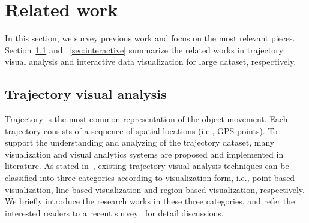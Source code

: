 \section{Related work}\label{sec:rel}
In this section, we survey previous work and focus on the most relevant pieces.
Section~\ref{sec:trajvisana} and ~\ref{sec:interactive} summarize the related works in trajectory visual analysis and interactive data visualization for large dataset, respectively.

\subsection{Trajectory visual analysis}\label{sec:trajvisana}
Trajectory is the most common representation of the object movement. 
Each trajectory consists of a sequence of spatial locations (i.e., GPS points).
To support the understanding and analyzing of the trajectory dataset, 
many visualization and visual analytics systems are proposed and implemented in literature. 
As stated in~\cite{chen2015survey}, existing trajectory visual analysis techniques can be classified into three categories according to visualization form,
i.e., point-based visualization, line-based visualization and region-based visualization, respectively.
We briefly introduce the research works in these three categories, and refer the interested readers to a recent survey~\cite{chen2015survey} for detail discussions. 

